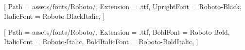 
\contourlength{0.8pt}

\renewcommand{\ULdepth}{3.8pt}

[
Path = assets/fonts/Roboto/,
Extension = .ttf,
UprightFont = Roboto-Black,
ItalicFont = Roboto-BlackItalic,
]

\setmainfont{Roboto-Regular}[
Path = assets/fonts/Roboto/,
Extension = .ttf,
BoldFont = Roboto-Bold,
ItalicFont = Roboto-Italic,
BoldItalicFont = Roboto-BoldItalic,
]